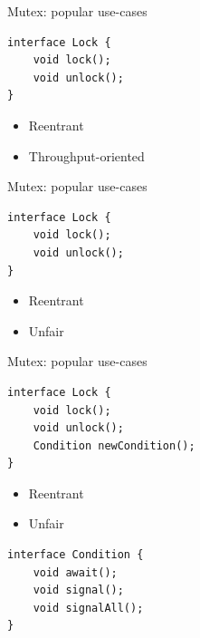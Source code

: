 
\begin{frame}{Mutex: popular use-cases}

\begin{verbatim}
interface Lock {
    void lock();
    void unlock();
}
\end{verbatim}

\begin{itemize}
    \item Reentrant
    \item Throughput-oriented
\end{itemize}

\end{frame}


\begin{frame}{Mutex: popular use-cases}

\begin{verbatim}
interface Lock {
    void lock();
    void unlock();
}
\end{verbatim}

\begin{itemize}
    \item Reentrant
    \item Unfair
\end{itemize}
\end{frame}


\begin{frame}{Mutex: popular use-cases}

\begin{verbatim}
interface Lock {
    void lock();
    void unlock();
    Condition newCondition();
}
\end{verbatim}

\begin{itemize}
    \item Reentrant
    \item Unfair
\end{itemize}

\begin{verbatim}
interface Condition {
    void await();
    void signal();
    void signalAll();
}
\end{verbatim}
\end{frame}

